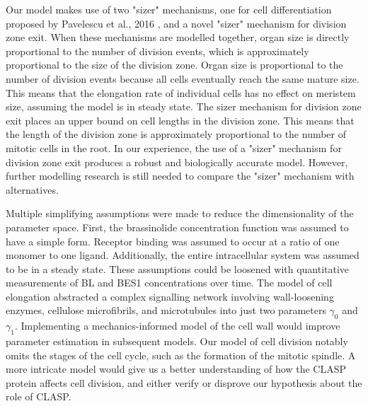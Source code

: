 \documentclass[referee,pdflatex,sn-mathphys-num]{sn-jnl}
\begin{document}
Our model makes use of two "sizer" mechanisms, one for cell differentiation proposed by Pavelescu et al., 2016 \cite{pavelescu2016}, and a novel "sizer" mechanism for division zone exit.
When these mechanisms are modelled together, organ size is directly proportional to the number of division events, which is approximately proportional to the size of the division zone.
Organ size is proportional to the number of division events because all cells eventually reach the same mature size.
This means that the elongation rate of individual cells has no effect on meristem size, assuming the model is in steady state.
The sizer mechanism for division zone exit places an upper bound on cell lengths in the division zone.
This means that the length of the division zone is approximately proportional to the number of mitotic cells in the root.
In our experience, the use of a "sizer" mechanism for division zone exit produces a robust and biologically accurate model.
However, further modelling research is still needed to compare the "sizer" mechanism with alternatives.
 
Multiple simplifying assumptions were made to reduce the dimensionality of the parameter space.
First, the brassinolide concentration function was assumed to have a simple form.
Receptor binding was assumed to occur at a ratio of one monomer to one ligand.
Additionally, the entire intracellular system was assumed to be in a steady state.
These assumptions could be loosened with quantitative measurements of BL and BES1 concentrations over time.
The model of cell elongation abstracted a complex signalling network involving wall-loosening enzymes, cellulose microfibrils, and microtubules \cite{smithers2024} into just two parameters $\gamma_{0}$ and $\gamma_{1}$.
Implementing a mechanics-informed model of the cell wall would improve parameter estimation in subsequent models.
Our model of cell division notably omits the stages of the cell cycle, such as the formation of the mitotic spindle.
A more intricate model would give us a better understanding of how the CLASP protein affects cell division, and either verify or disprove our hypothesis about the role of CLASP.
\end{document}
